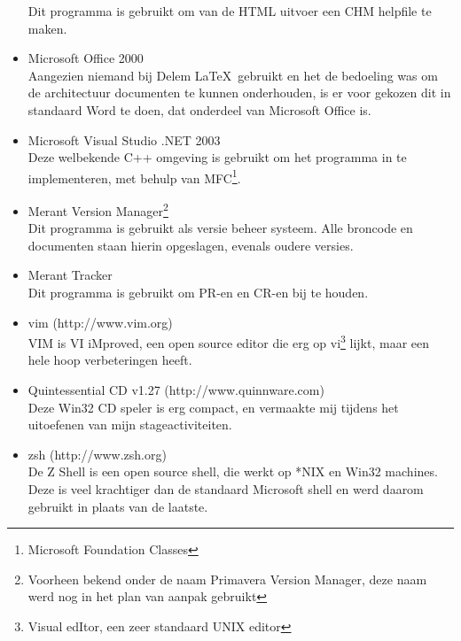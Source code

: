 \begin{itemize}
Dit programma is gebruikt om van de HTML uitvoer een CHM helpfile te maken.
\item Microsoft Office 2000 \\
Aangezien niemand bij Delem \LaTeX \mbox{ }gebruikt en het de bedoeling was om de architectuur documenten te kunnen onderhouden, is er voor gekozen dit in standaard Word te doen, dat onderdeel van Microsoft Office is.
\item Microsoft Visual Studio .NET 2003 \\
Deze welbekende C++ omgeving is gebruikt om het programma in te implementeren, met behulp van MFC\footnote{Microsoft Foundation Classes}.
\item Merant Version Manager\footnote{Voorheen bekend onder de naam Primavera Version Manager, deze naam werd nog in het plan van aanpak gebruikt} \\
Dit programma is gebruikt als versie beheer systeem. Alle broncode en documenten staan hierin opgeslagen, evenals oudere versies.
\item Merant Tracker \\
Dit programma is gebruikt om PR-en en CR-en bij te houden.
\item {}vim (http://www.vim.org) \\
VIM is VI iMproved, een open source editor die erg op vi\footnote{Visual edItor, een zeer standaard UNIX editor} lijkt, maar een hele hoop verbeteringen heeft.
\item {}Quintessential CD v1.27 (http://www.quinnware.com) \\
Deze Win32 CD speler is erg compact, en vermaakte mij tijdens het uitoefenen van mijn stageactiviteiten.
\item {}zsh (http://www.zsh.org) \\
De Z Shell is een open source shell, die werkt op *NIX en Win32 machines. Deze is veel krachtiger dan de standaard Microsoft shell en werd daarom gebruikt in plaats van de laatste.
\end{itemize}
